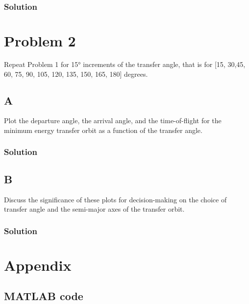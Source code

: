 \documentclass[conf]{new-aiaa}
\begin{document}
\subsubsection*{Solution}

\newpage 
\section*{Problem 2}

Repeat Problem 1 for 15° increments of the transfer angle, that is for [15, 30,45, 60, 75,
90, 105, 120, 135, 150, 165, 180] degrees.

\subsection*{A}
Plot the departure angle, the arrival angle, and the time-of-flight for the minimum
energy transfer orbit as a function of the transfer angle.

\subsubsection*{Solution}


\subsection*{B}
Discuss the significance of these plots for decision-making on the choice of
transfer angle and the semi-major axes of the transfer orbit.

\subsubsection*{Solution}


\newpage
\section*{Appendix} 

\subsection*{MATLAB code} 
\end{document}

